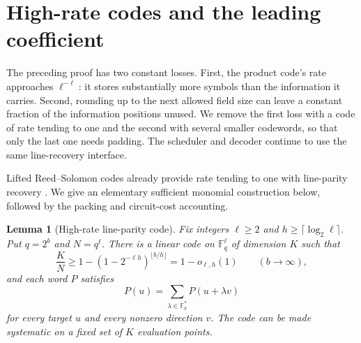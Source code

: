 \documentclass[11pt]{article}
\newtheorem{lemma}[lemma]{Lemma}
\newcommand{\F}{\mathbb{F}}
\begin{document}
\section{High-rate codes and the leading coefficient}\label{sec:high-rate}

The preceding proof has two constant losses.  First, the product code's rate
approaches $\ell^{-\ell}$: it stores substantially more symbols than the
information it carries.  Second, rounding up to the next allowed field size
can leave a constant fraction of the information positions unused.
We remove the first loss with a code of rate tending to one and the second
with several smaller codewords, so that only the last one needs padding.
The scheduler and decoder continue to use the same line-recovery interface.

Lifted Reed--Solomon codes already provide
rate tending to one with line-parity recovery
\cite{GuoKoppartySudan2013,HolzbaurEtAl2020}.  We give an elementary sufficient
monomial construction below, followed by the packing and circuit-cost
accounting.

\begin{lemma}[High-rate line-parity code]\label{lem:high-rate-code}
Fix integers $\ell\ge2$ and $h\ge\lceil\log_2\ell\rceil$.  Put $q=2^b$ and
$N=q^\ell$.  There is a
linear code on $\F_q^\ell$ of dimension $K$ such that
\begin{equation}\label{eq:high-rate}
  \frac KN\ge1-(1-2^{-\ell h})^{\lfloor b/h\rfloor}
       =1-o_{\ell,h}(1)\qquad(b\to\infty),
\end{equation}
and each word $P$ satisfies
\[
  P(u)=\sum_{\lambda\in\F_q^*}P(u+\lambda v)
\]
for every target $u$ and every nonzero direction $v$.  The code can be made
systematic on a fixed set of $K$ evaluation points.
\end{lemma}
\end{document}
